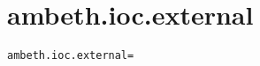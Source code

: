 \section{ambeth.ioc.external}
\label{configuration:AmbethIocExternal}
\ClearAPI
\TODO%
\begin{lstlisting}[style=Props,caption={Usage example for \textit{ambeth.ioc.external}}]
ambeth.ioc.external=
\end{lstlisting}
